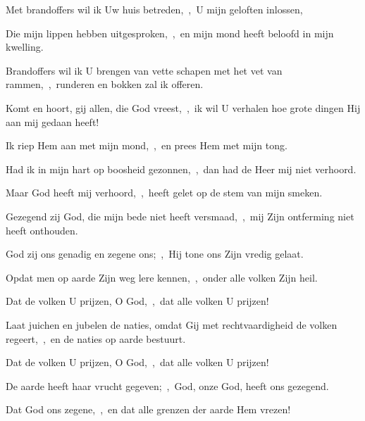 \documentclass[12pt,twoside,a5paper]{article}
\begin{document}
\begin{halfparskip}
  Met brandoffers wil ik Uw huis betreden,~\sep\ U mijn geloften inlossen,

  Die mijn lippen hebben uitgesproken,~\sep\ en mijn mond heeft beloofd in mijn kwelling.

  Brandoffers wil ik U brengen van vette schapen met het vet van rammen,~\sep\ runderen en bokken zal ik offeren.

  Komt en hoort, gij allen, die God vreest,~\sep\ ik wil U verhalen hoe grote dingen Hij aan mij gedaan heeft!

  Ik riep Hem aan met mijn mond,~\sep\ en prees Hem met mijn tong.

  Had ik in mijn hart op boosheid gezonnen,~\sep\ dan had de Heer mij niet verhoord.

  Maar God heeft mij verhoord,~\sep\ heeft gelet op de stem van mijn smeken.

  Gezegend zij God, die mijn bede niet heeft versmaad,~\sep\ mij Zijn ontferming niet heeft onthouden.
\end{halfparskip}



\begin{halfparskip}
  God zij ons genadig en zegene ons;~\sep\ Hij tone ons Zijn vredig gelaat.


  Opdat men op aarde Zijn weg lere kennen,~\sep\ onder alle volken Zijn heil.

  Dat de volken U prijzen, O God,~\sep\ dat alle volken U prijzen!
\end{halfparskip}


\begin{halfparskip}
  Laat juichen en jubelen de naties, omdat Gij met rechtvaardigheid de volken regeert,~\sep\ en de naties op aarde bestuurt.

  Dat de volken U prijzen, O God,~\sep\ dat alle volken U prijzen!

  De aarde heeft haar vrucht gegeven;~\sep\ God, onze God, heeft ons gezegend.

  Dat God ons zegene,~\sep\ en dat alle grenzen der aarde Hem vrezen!
\end{halfparskip}
\end{document}
